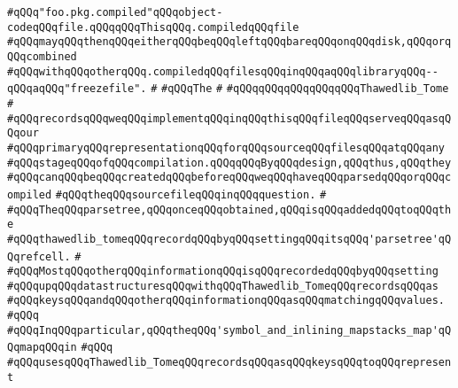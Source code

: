 \verb|#qQQq"foo.pkg.compiled"qQQqobject-codeqQQqfile.qQQqqQQqThisqQQq.compiledqQQqfile|\newline
\verb|#qQQqmayqQQqthenqQQqeitherqQQqbeqQQqleftqQQqbareqQQqonqQQqdisk,qQQqorqQQqcombined|\newline
\verb|#qQQqwithqQQqotherqQQq.compiledqQQqfilesqQQqinqQQqaqQQqlibraryqQQq--qQQqaqQQq"freezefile".|\newline
\verb|#|\newline
\verb|#qQQqThe|\newline
\verb|#|\newline
\verb|#qQQqqQQqqQQqqQQqqQQqThawedlib_Tome|\newline
\verb|#|\newline
\verb|#qQQqrecordsqQQqweqQQqimplementqQQqinqQQqthisqQQqfileqQQqserveqQQqasqQQqour|\newline
\verb|#qQQqprimaryqQQqrepresentationqQQqforqQQqsourceqQQqfilesqQQqatqQQqany|\newline
\verb|#qQQqstageqQQqofqQQqcompilation.qQQqqQQqByqQQqdesign,qQQqthus,qQQqthey|\newline
\verb|#qQQqcanqQQqbeqQQqcreatedqQQqbeforeqQQqweqQQqhaveqQQqparsedqQQqorqQQqcompiled|\newline
\verb|#qQQqtheqQQqsourcefileqQQqinqQQqquestion.|\newline
\verb|#|\newline
\verb|#qQQqTheqQQqparsetree,qQQqonceqQQqobtained,qQQqisqQQqaddedqQQqtoqQQqthe|\newline
\verb|#qQQqthawedlib_tomeqQQqrecordqQQqbyqQQqsettingqQQqitsqQQq'parsetree'qQQqrefcell.|\newline
\verb|#|\newline
\verb|#qQQqMostqQQqotherqQQqinformationqQQqisqQQqrecordedqQQqbyqQQqsetting|\newline
\verb|#qQQqupqQQqdatastructuresqQQqwithqQQqThawedlib_TomeqQQqrecordsqQQqas|\newline
\verb|#qQQqkeysqQQqandqQQqotherqQQqinformationqQQqasqQQqmatchingqQQqvalues.|\newline
\verb|#qQQq|\newline
\verb|#qQQqInqQQqparticular,qQQqtheqQQq'symbol_and_inlining_mapstacks_map'qQQqmapqQQqin|\newline
\verb|#qQQq|\newline
\verb|#qQQqusesqQQqThawedlib_TomeqQQqrecordsqQQqasqQQqkeysqQQqtoqQQqrepresent|\newline
